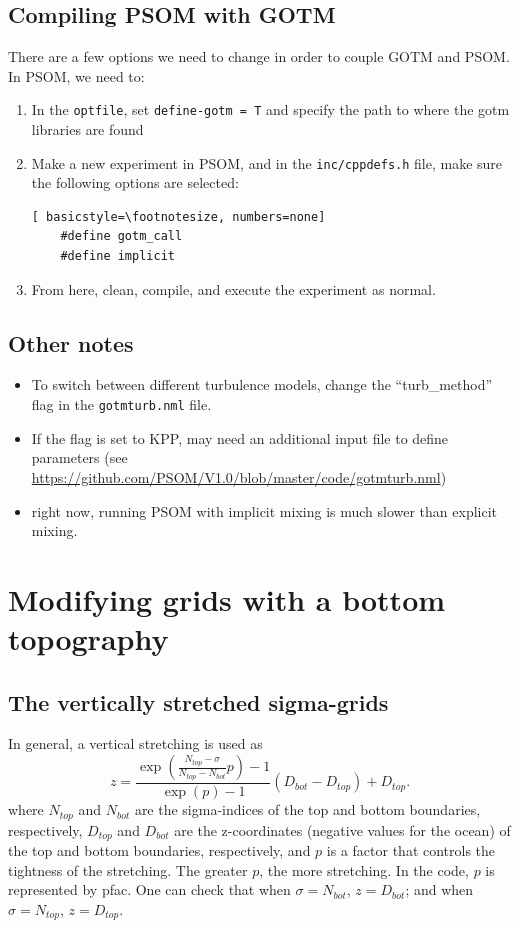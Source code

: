 \documentclass[12pt,letterpaper,titlepage]{article}
\newcommand{\Blue}[1]{{\color{blue}#1}}
\begin{document}
\subsection{Compiling PSOM with GOTM}
There are a few options we need to change in order to couple GOTM and PSOM. In PSOM, we need to:
\begin{enumerate}
    \item In the \texttt{optfile}, set \texttt{define-gotm = T} and specify the path to where the gotm libraries are found
    \item Make a new experiment in PSOM, and in the \texttt{inc/cppdefs.h} file, make sure the following options are selected:
    \begin{lstlisting}[	basicstyle=\footnotesize, numbers=none]
    #define gotm_call
    #define implicit
    \end{lstlisting}
    \item From here, clean, compile, and execute the experiment as normal. 
\end{enumerate}

\subsection{Other notes}
\begin{itemize}
    \item To switch between different turbulence models, change the ``turb\_method'' flag in the \texttt{gotmturb.nml} file.
    \item If the flag is set to KPP, may need an additional input file to define parameters (see \href{https://github.com/PSOM/V1.0/blob/master/code/gotmturb.nml}{ https://github.com/PSOM/V1.0/blob/master/code/gotmturb.nml})
    \item right now, running PSOM with implicit mixing is much slower than explicit mixing. 
\end{itemize}

\section{Modifying grids with a bottom topography}
\subsection{The vertically stretched sigma-grids}

In general, a vertical stretching is used as
\begin{equation}
  z = \frac{\exp\left(\frac{N_{top}-\sigma}{N_{top} - N_{bot}} p\right) - 1}{\exp(p)-1} (D_{bot} - D_{top}) +D_{top}.\label{eq:z}
\end{equation}
where $N_{top}$ and $N_{bot}$ are the sigma-indices of the top and bottom boundaries, respectively, $D_{top}$ and $D_{bot}$ are the z-coordinates (negative values for the ocean) of the top and bottom boundaries, respectively, and $p$ is a factor that controls the tightness of the stretching. The greater $p$, the more stretching. In the code, $p$ is represented by \Blue{pfac}. One can check that when $\sigma = N_{bot}$, $z =D_{bot}$; and when $\sigma = N_{top}$, $z =D_{top}$. \par
\end{document}

